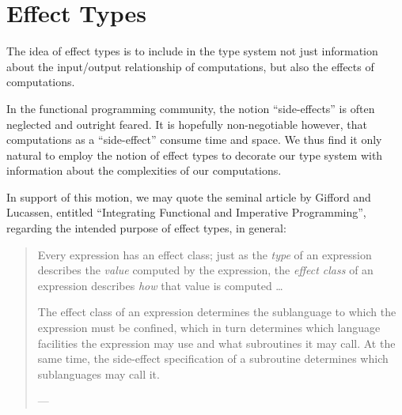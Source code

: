 \chapter{Effect Types}

The idea of effect types is to include in the type system not just information
about the input/output relationship of computations, but also the effects of
computations.

In the functional programming community, the notion ``side-effects'' is often
neglected and outright feared. It is hopefully non-negotiable however, that
computations as a ``side-effect'' consume time and space. We thus find it only
natural to employ the notion of effect types to decorate our type system with
information about the complexities of our computations.

In support of this motion, we may quote the seminal article by Gifford and
Lucassen, entitled ``Integrating Functional and Imperative Programming'',
regarding the intended purpose of effect types, in general:

\begin{quotation}

Every expression has an effect class; just as the \emph{type} of an expression
describes the \emph{value} computed by the expression, the \emph{effect class}
of an expression describes \emph{how} that value is computed \ldots


The effect class of an expression determines the sublanguage to which the
expression must be confined, which in turn determines which language facilities
the expression may use and what subroutines it may call. At the same time, the
side-effect specification of a subroutine determines which sublanguages may
call it.

\begin{flushright}

\footnotesize\sffamily

--- \cite{gifford-lucassen-1986}

\end{flushright}

\end{quotation}

